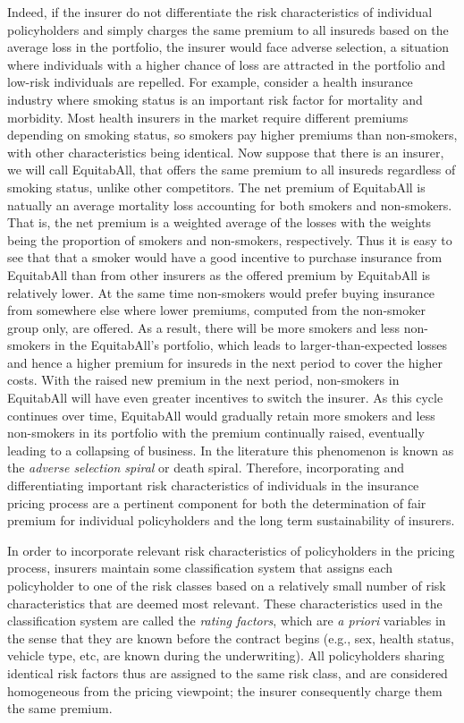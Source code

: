 \documentclass[]{book}
\theoremstyle{definition}
\theoremstyle{definition}
\theoremstyle{definition}
\theoremstyle{remark}
\begin{document}
Indeed, if the insurer do not differentiate the risk characteristics of
individual policyholders and simply charges the same premium to all
insureds based on the average loss in the portfolio, the insurer would
face adverse selection, a situation where individuals with a higher
chance of loss are attracted in the portfolio and low-risk individuals
are repelled. For example, consider a health insurance industry where
smoking status is an important risk factor for mortality and morbidity.
Most health insurers in the market require different premiums depending
on smoking status, so smokers pay higher premiums than non-smokers, with
other characteristics being identical. Now suppose that there is an
insurer, we will call EquitabAll, that offers the same premium to all
insureds regardless of smoking status, unlike other competitors. The net
premium of EquitabAll is natually an average mortality loss accounting
for both smokers and non-smokers. That is, the net premium is a weighted
average of the losses with the weights being the proportion of smokers
and non-smokers, respectively. Thus it is easy to see that that a smoker
would have a good incentive to purchase insurance from EquitabAll than
from other insurers as the offered premium by EquitabAll is relatively
lower. At the same time non-smokers would prefer buying insurance from
somewhere else where lower premiums, computed from the non-smoker group
only, are offered. As a result, there will be more smokers and less
non-smokers in the EquitabAll's portfolio, which leads to
larger-than-expected losses and hence a higher premium for insureds in
the next period to cover the higher costs. With the raised new premium
in the next period, non-smokers in EquitabAll will have even greater
incentives to switch the insurer. As this cycle continues over time,
EquitabAll would gradually retain more smokers and less non-smokers in
its portfolio with the premium continually raised, eventually leading to
a collapsing of business. In the literature this phenomenon is known as
the \emph{adverse selection spiral} or death spiral. Therefore,
incorporating and differentiating important risk characteristics of
individuals in the insurance pricing process are a pertinent component
for both the determination of fair premium for individual policyholders
and the long term sustainability of insurers.

In order to incorporate relevant risk characteristics of policyholders
in the pricing process, insurers maintain some classification system
that assigns each policyholder to one of the risk classes based on a
relatively small number of risk characteristics that are deemed most
relevant. These characteristics used in the classification system are
called the \emph{rating factors}, which are \emph{a priori} variables in
the sense that they are known before the contract begins (e.g., sex,
health status, vehicle type, etc, are known during the underwriting).
All policyholders sharing identical risk factors thus are assigned to
the same risk class, and are considered homogeneous from the pricing
viewpoint; the insurer consequently charge them the same premium.
\end{document}
